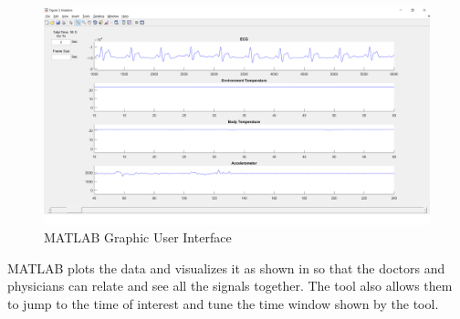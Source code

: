  \begin{figure}
	\centering  
	\includegraphics[scale = 0.4 ]{MATLAB_GUI}
\caption{MATLAB Graphic User Interface}
\label{fig:matlab_gui}
\end{figure}

MATLAB plots the data and visualizes it as shown in
 so that the doctors and physicians can relate
and see all the signals together. The tool also allows them to jump
to the time of interest and tune the time window shown by the tool. 



